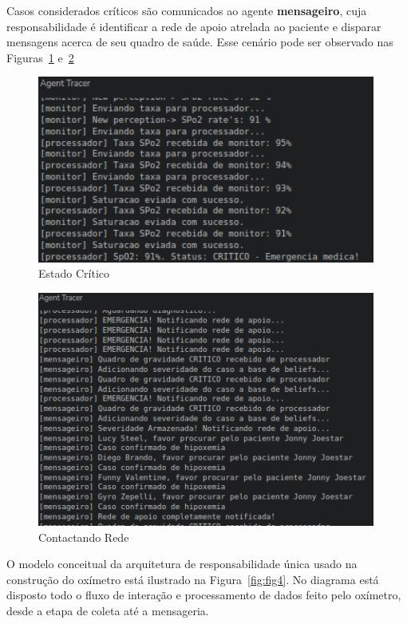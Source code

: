 Casos considerados críticos são comunicados ao agente \textbf{mensageiro}, cuja responsabilidade é identificar a rede de apoio atrelada ao paciente e disparar mensagens acerca de seu quadro de saúde. Esse cenário pode ser observado nas Figuras~\ref{fig:fig2} e~\ref{fig:fig3}

\begin{figure}[H]
  \centering
  \includegraphics[width=0.99\textwidth]{assets/img/perception.emergency - Copia.png}
  \caption{Estado Crítico}
  \label{fig:fig2}
\end{figure}


\begin{figure}[H]
  \centering
  \includegraphics[width=0.99\textwidth]{assets/img/netwokcall - Copia.png}
  \caption{Contactando Rede}
  \label{fig:fig3}
\end{figure}

O modelo conceitual da arquitetura de responsabilidade única usado na construção do oxímetro está ilustrado na Figura~\ref{fig:fig4}. 
No diagrama está disposto todo o fluxo de interação e processamento de dados feito pelo oxímetro, desde a etapa de coleta até a mensageria.

